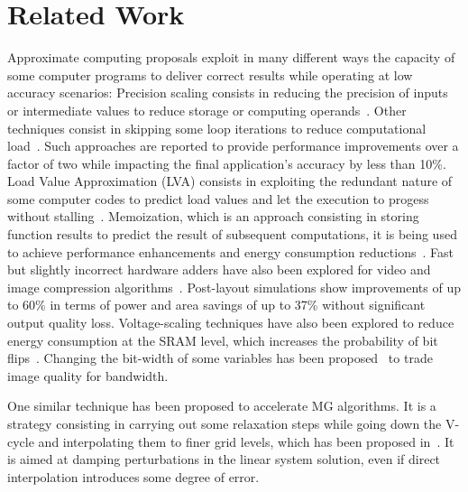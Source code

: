 \section{Related Work}
\label{sec:related}

Approximate computing proposals exploit in many different ways the capacity of
some computer programs to deliver correct results while operating at low
accuracy scenarios: Precision scaling consists in reducing the precision of
inputs or intermediate values to reduce storage or computing
operands~\cite{Yeh2007, Tian2015}.  Other techniques consist in skipping some
loop iterations to reduce computational load~\cite{Sidiroglou2011}.  
Such approaches are reported to provide performance improvements over a factor of two
while impacting the final application's accuracy by less than 10\%.
Load Value
Approximation (LVA) consists in exploiting the redundant nature of some
computer codes to predict load values and let the execution to progess without
stalling~\cite{Miguel2014}.  Memoization, which is an approach consisting in
storing function results to predict the result of subsequent computations, it
is being used to achieve performance enhancements and energy consumption
reductions~\cite{Alvarez2005, Brumar2017}. 
Fast but slightly incorrect
hardware adders have also been explored 
for video and image compression algorithms~\cite{Gupta:2011}. 
Post-layout simulations show improvements of up to 60\% in terms of power and area savings of up to 37\%
without significant output quality loss.
Voltage-scaling techniques have also been explored to reduce energy consumption at the SRAM level, which increases
the probability of bit flips~\cite{Sampson:2011}. 
Changing the bit-width of
some variables has been proposed~\cite{Park:2010} to trade image quality for
bandwidth.

One similar technique has been proposed to accelerate MG algorithms. It is a strategy consisting in carrying out some relaxation steps while going down the V-cycle
and interpolating them to finer grid levels, which has been proposed in~\cite{JAMESON}.
It is aimed at damping perturbations in the linear system solution, even if
direct interpolation introduces some degree of error.


